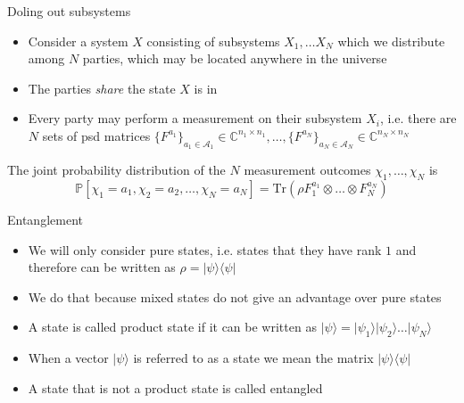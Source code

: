\begin{frame}{Doling out subsystems}
\begin{itemize}
    \item Consider a system $X$ consisting of subsystems $X_1, \dots X_N$ which we distribute among $N$ parties, which may be located anywhere in the universe \pause
    \item The parties \textit{share} the state $X$ is in \pause
    \item Every party may perform a measurement on their subsystem $X_i$, i.e. there are $N$ sets of psd matrices $\{F^{a_1} \}_{a_1 \in \mathcal{A}_1} \in \mathbb{C}^{n_1 \times n_1}, \dots , \{F^{a_N} \}_{a_N \in \mathcal{A}_N} \in \mathbb{C}^{n_N \times n_N} $ \pause
\end{itemize}
    
\begin{block}{}
    The joint probability distribution of the $N$ measurement outcomes $\chi_1 , \dots , \chi_N$ is 
\begin{equation*}
\mathbb{P}\left[ \chi_1 = a_1, \chi_2 = a_2, \dots , \chi_N = a_N \right] = \text{Tr}(\rho F_1^{a_1} \otimes \dots \otimes F_N^{a_N}) 
\end{equation*}
\end{block}
\end{frame}

\begin{frame}{Entanglement}
\begin{itemize}
    \item We will only consider pure states, i.e. states that they have rank $1$ and therefore can be written as $\rho = \vert \psi \rangle \langle \psi \vert$ \pause
    \item We do that because mixed states do not give an advantage over pure states \pause
    \item A state is called product state if it can be written as $\vert \psi \rangle = \vert \psi_1 \rangle \vert \psi_2 \rangle \dots \vert \psi_N \rangle$ \pause
    \item When a vector $\vert \psi \rangle$ is referred to as a state we mean the matrix $\vert \psi \rangle \langle \psi \vert$ \pause
    \item A state that is not a product state is called entangled
\end{itemize}
 \end{frame}   


